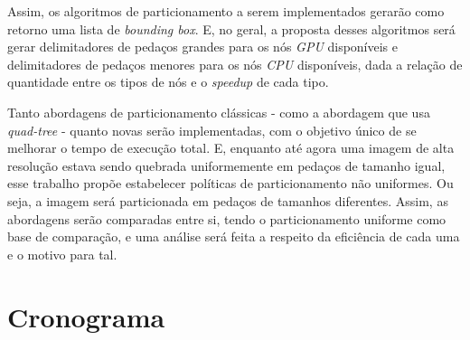 Assim, os algoritmos de particionamento a serem implementados gerarão como retorno uma lista de \textit{bounding box}. E, no geral, a proposta desses algoritmos será gerar delimitadores de pedaços grandes para os nós \textit{GPU} disponíveis e delimitadores de pedaços menores para os nós \textit{CPU} disponíveis, dada a relação de quantidade entre os tipos de nós e o \textit{speedup} de cada tipo.

Tanto abordagens de particionamento clássicas - como a abordagem que usa \textit{quad-tree}\cite{spann_wilson_1985} - quanto novas serão implementadas, com o objetivo único de se melhorar o tempo de execução total. E, enquanto até agora uma imagem de alta resolução estava sendo quebrada uniformemente em pedaços de tamanho igual, esse trabalho propõe estabelecer políticas de particionamento não uniformes. Ou seja, a imagem será particionada em pedaços de tamanhos diferentes. Assim, as abordagens serão comparadas entre si, tendo o particionamento uniforme como base de comparação, e uma análise será feita a respeito da eficiência de cada uma e o motivo para tal.

\pagebreak
\section{Cronograma}


\begin{table}[htbp]
\LARGE
\caption{Cronograma de atividades}     %
\begin{center}
\end{center}
\label{cronograma} %
\end{table}
